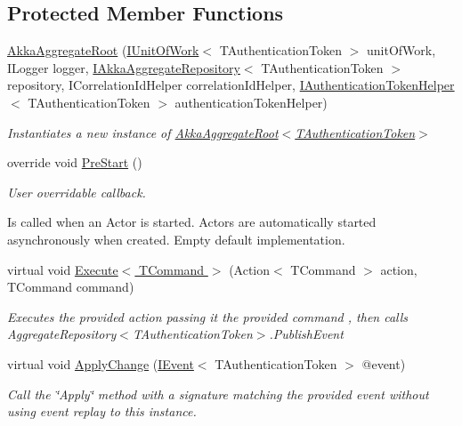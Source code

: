 \subsection*{Protected Member Functions}
\begin{DoxyCompactItemize}
\item 
\hyperlink{classCqrs_1_1Akka_1_1Domain_1_1AkkaAggregateRoot_a060f981e4c3023aec36e7c6f1cfb3a9d_a060f981e4c3023aec36e7c6f1cfb3a9d}{Akka\+Aggregate\+Root} (\hyperlink{interfaceCqrs_1_1Domain_1_1IUnitOfWork}{I\+Unit\+Of\+Work}$<$ T\+Authentication\+Token $>$ unit\+Of\+Work, I\+Logger logger, \hyperlink{interfaceCqrs_1_1Akka_1_1Domain_1_1IAkkaAggregateRepository}{I\+Akka\+Aggregate\+Repository}$<$ T\+Authentication\+Token $>$ repository, I\+Correlation\+Id\+Helper correlation\+Id\+Helper, \hyperlink{interfaceCqrs_1_1Authentication_1_1IAuthenticationTokenHelper}{I\+Authentication\+Token\+Helper}$<$ T\+Authentication\+Token $>$ authentication\+Token\+Helper)
\begin{DoxyCompactList}\small\item\em Instantiates a new instance of \hyperlink{classCqrs_1_1Akka_1_1Domain_1_1AkkaAggregateRoot_a060f981e4c3023aec36e7c6f1cfb3a9d_a060f981e4c3023aec36e7c6f1cfb3a9d}{Akka\+Aggregate\+Root$<$\+T\+Authentication\+Token$>$} \end{DoxyCompactList}\item 
override void \hyperlink{classCqrs_1_1Akka_1_1Domain_1_1AkkaAggregateRoot_a7da2d3a244e34717ec5af1db8f0042bc_a7da2d3a244e34717ec5af1db8f0042bc}{Pre\+Start} ()
\begin{DoxyCompactList}\small\item\em User overridable callback. 

Is called when an Actor is started. Actors are automatically started asynchronously when created. Empty default implementation. \end{DoxyCompactList}\item 
virtual void \hyperlink{classCqrs_1_1Akka_1_1Domain_1_1AkkaAggregateRoot_af8a9bd0e80498b3b54beb7cbec820533_af8a9bd0e80498b3b54beb7cbec820533}{Execute$<$ T\+Command $>$} (Action$<$ T\+Command $>$ action, T\+Command command)
\begin{DoxyCompactList}\small\item\em Executes the provided {\itshape action}  passing it the provided {\itshape command} , then calls Aggregate\+Repository$<$\+T\+Authentication\+Token$>$.\+Publish\+Event \end{DoxyCompactList}\item 
virtual void \hyperlink{classCqrs_1_1Akka_1_1Domain_1_1AkkaAggregateRoot_aaa135cb26be9e5353986f5611f05c059_aaa135cb26be9e5353986f5611f05c059}{Apply\+Change} (\hyperlink{interfaceCqrs_1_1Events_1_1IEvent}{I\+Event}$<$ T\+Authentication\+Token $>$ @event)
\begin{DoxyCompactList}\small\item\em Call the \char`\"{}\+Apply\char`\"{} method with a signature matching the provided {\itshape event}  without using event replay to this instance. \end{DoxyCompactList}\end{DoxyCompactItemize}
